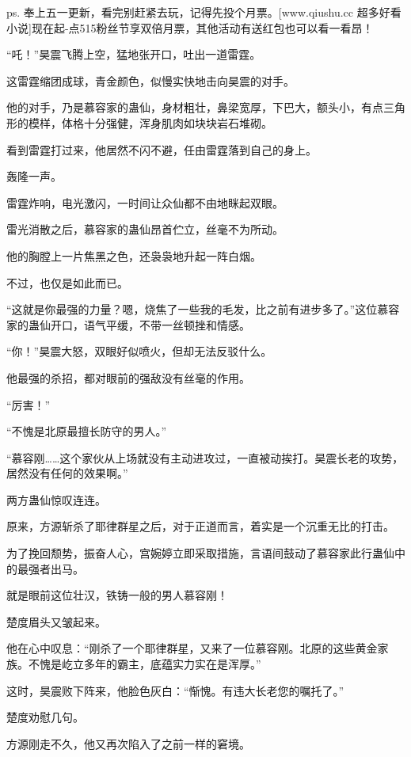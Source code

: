
\begin{this_body}

ps. 奉上五一更新，看完别赶紧去玩，记得先投个月票。[www.qiushu.cc 超多好看小说]现在起-点515粉丝节享双倍月票，其他活动有送红包也可以看一看昂！

“吒！”昊震飞腾上空，猛地张开口，吐出一道雷霆。

这雷霆缩团成球，青金颜色，似慢实快地击向昊震的对手。

他的对手，乃是慕容家的蛊仙，身材粗壮，鼻梁宽厚，下巴大，额头小，有点三角形的模样，体格十分强健，浑身肌肉如块块岩石堆砌。

看到雷霆打过来，他居然不闪不避，任由雷霆落到自己的身上。

轰隆一声。

雷霆炸响，电光激闪，一时间让众仙都不由地眯起双眼。

雷光消散之后，慕容家的蛊仙昂首伫立，丝毫不为所动。

他的胸膛上一片焦黑之色，还袅袅地升起一阵白烟。

不过，也仅是如此而已。

“这就是你最强的力量？嗯，烧焦了一些我的毛发，比之前有进步多了。”这位慕容家的蛊仙开口，语气平缓，不带一丝顿挫和情感。

“你！”昊震大怒，双眼好似喷火，但却无法反驳什么。

他最强的杀招，都对眼前的强敌没有丝毫的作用。

“厉害！”

“不愧是北原最擅长防守的男人。”

“慕容刚……这个家伙从上场就没有主动进攻过，一直被动挨打。昊震长老的攻势，居然没有任何的效果啊。”

两方蛊仙惊叹连连。

原来，方源斩杀了耶律群星之后，对于正道而言，着实是一个沉重无比的打击。

为了挽回颓势，振奋人心，宫婉婷立即采取措施，言语间鼓动了慕容家此行蛊仙中的最强者出马。

就是眼前这位壮汉，铁铸一般的男人慕容刚！

楚度眉头又皱起来。

他在心中叹息：“刚杀了一个耶律群星，又来了一位慕容刚。北原的这些黄金家族。不愧是屹立多年的霸主，底蕴实力实在是浑厚。”

这时，昊震败下阵来，他脸色灰白：“惭愧。有违大长老您的嘱托了。”

楚度劝慰几句。

方源刚走不久，他又再次陷入了之前一样的窘境。


\end{this_body}

